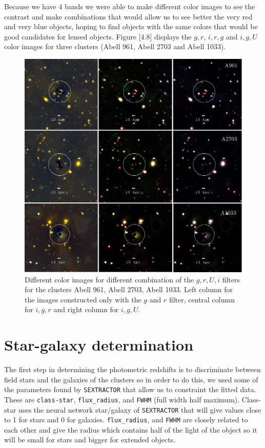 Because we have 4 bands we were able to make different color images to see the contrast and make combinations that would allow us to see better the very red and very blue objects, hoping to find objects with the same colors that would be good candidates for lensed objects. Figure [4.8] displays the $g,r$, $i,r,g$ and $i,g,U$ color images for three clusters (Abell 961, Abell 2703 and Abell 1033). 

\begin{figure}[H]
\centering
\includegraphics[width=15cm]{images/full_small.jpg}
\caption[Color images for various clusters]{Different color images for different combination of the $g,r,U,i$ filters for the clusters Abell 961, Abell 2703, Abell 1033. Left column for the images constructed only with the $g$ and $r$ filter, central column for $i,g,r$ and right column for $i,g,U$.}
\end{figure}

\section{Star-galaxy determination}

The first step in determining the photometric redshifts is to discriminate between field stars and the galaxies of the clusters so in order to do this, we used some of the parameters found by \texttt{SEXTRACTOR} that allow us to constraint the fitted data. These are \texttt{class-star}, \texttt{flux\_radius}, and \texttt{FWHM} (full width half maximum). Class-star uses the neural network star/galaxy of \texttt{SEXTRACTOR} that will give values close to 1 for stars and 0 for galaxies. \texttt{flux\_radius}, and \texttt{FWHM} are closely related to each other and give the radius which contains half of the light of the object so it will be small for stars and bigger for extended objects.

